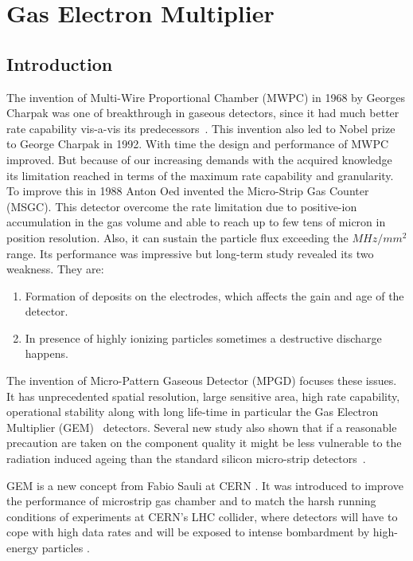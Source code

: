 \chapter{Gas Electron Multiplier} %
\label{cha:gas_electron_multiplier}

\section{Introduction} %
\label{sec:introduction}

The invention of Multi-Wire Proportional Chamber (MWPC) in 1968 by Georges Charpak was one of breakthrough in gaseous detectors, since it had much better rate capability vis-a-vis its predecessors~\cite{Charpak1968}. This invention also led to Nobel prize to George Charpak in 1992. With time the design and performance of MWPC improved. But because of our increasing demands with the acquired knowledge its limitation reached in terms of the maximum rate capability and granularity. To improve this in 1988 Anton Oed invented the Micro-Strip Gas Counter (MSGC). This detector overcome the rate limitation due to positive-ion accumulation in the gas volume and able to reach up to few tens of micron in position resolution. Also, it can sustain the particle flux exceeding the $MHz/mm^2$ range. Its performance was impressive but long-term study revealed its two weakness. They are:
\begin{enumerate}
	\item Formation of deposits on the electrodes, which affects the gain and age of the detector.
	\item In presence of highly ionizing particles sometimes a destructive discharge happens.
\end{enumerate}
The invention of Micro-Pattern Gaseous Detector (MPGD) focuses these issues. It has unprecedented spatial resolution, large sensitive area, high rate capability, operational stability along with long life-time in particular the Gas Electron Multiplier (GEM)~\cite{Sauli1997,Sauli1999} detectors. Several new study also shown that if a reasonable precaution are taken on the component quality it might be less vulnerable to the radiation induced ageing than the standard silicon micro-strip detectors~\cite{TITOV2004,Titov2002}.

GEM is a new concept from Fabio Sauli at CERN \cite{Sauli1997}. It was introduced to improve the performance of microstrip gas chamber and to match the harsh running conditions of experiments at CERN's LHC collider, where detectors will have to cope with high data rates and will be exposed to intense bombardment by high-energy particles \cite{detector:1732870}.


